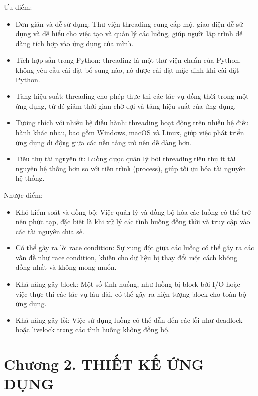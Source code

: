 \documentclass{article} %
\begin{document}
Ưu điểm:
\begin{itemize}
    \item Đơn giản và dễ sử dụng: Thư viện threading cung cấp một giao diện dễ sử dụng và dễ hiểu cho việc tạo và quản lý các luồng, giúp người lập trình dễ dàng tích hợp vào ứng dụng của mình.
    \item Tích hợp sẵn trong Python: threading là một thư viện chuẩn của Python, không yêu cầu cài đặt bổ sung nào, nó được cài đặt mặc định khi cài đặt Python.
    \item Tăng hiệu suất: threading cho phép thực thi các tác vụ đồng thời trong một ứng dụng, từ đó giảm thời gian chờ đợi và tăng hiệu suất của ứng dụng.
    \item Tương thích với nhiều hệ điều hành: threading hoạt động trên nhiều hệ điều hành khác nhau, bao gồm Windows, macOS và Linux, giúp việc phát triển ứng dụng di động giữa các nền tảng trở nên dễ dàng hơn.
    \item Tiêu thụ tài nguyên ít: Luồng được quản lý bởi threading tiêu thụ ít tài nguyên hệ thống hơn so với tiến trình (process), giúp tối ưu hóa tài nguyên hệ thống.
\end{itemize}
\hspace{0.0em} Nhược điểm:
\begin{itemize}
    \item Khó kiểm soát và đồng bộ: Việc quản lý và đồng bộ hóa các luồng có thể trở nên phức tạp, đặc biệt là khi xử lý các tình huống đồng thời và truy cập vào các tài nguyên chia sẻ.
    \item Có thể gây ra lỗi race condition: Sự xung đột giữa các luồng có thể gây ra các vấn đề như race condition, khiến cho dữ liệu bị thay đổi một cách không đồng nhất và không mong muốn.
    \item Khả năng gây block: Một số tình huống, như luồng bị block bởi I/O hoặc việc thực thi các tác vụ lâu dài, có thể gây ra hiện tượng block cho toàn bộ ứng dụng.
    \item Khả năng gây lỗi: Việc sử dụng luồng có thể dẫn đến các lỗi như deadlock hoặc livelock trong các tình huống không đồng bộ.
\end{itemize}
\newpage

\section*{Chương 2. THIẾT KẾ ỨNG DỤNG}
\setcounter{section}{2}
\setcounter{subsection}{0}
\end{document}
